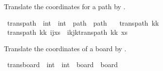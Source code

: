\begin{isabellebody}
%
\isadelimdocument
%
\endisadelimdocument
%
\isatagdocument
%
\isamarkuptrue%
%
\endisatagdocument
{\isafolddocument}%
%
\isadelimdocument
%
\endisadelimdocument
%
\begin{isamarkuptext}%
Translate the coordinates for a path by .%
\end{isamarkuptext}\isamarkuptrue%
\isamarkupfalse%
\ trans{\isacharunderscore}{\kern0pt}path\ {\isacharcolon}{\kern0pt}{\isacharcolon}{\kern0pt}\ {\isachardoublequoteopen}int\ {\isasymtimes}\ int\ {\isasymRightarrow}\ path\ {\isasymRightarrow}\ path{\isachardoublequoteclose}\ \isanewline
\ \ {\isachardoublequoteopen}trans{\isacharunderscore}{\kern0pt}path\ {\isacharparenleft}{\kern0pt}kk\ {\isacharbrackleft}{\kern0pt}{\isacharbrackright}{\kern0pt}\ {\isacharequal}{\kern0pt}\ {\isacharbrackleft}{\kern0pt}{\isacharbrackright}{\kern0pt}{\isachardoublequoteclose}\isanewline
{\isacharbar}{\kern0pt}\ {\isachardoublequoteopen}trans{\isacharunderscore}{\kern0pt}path\ {\isacharparenleft}{\kern0pt}kk\ {\isacharparenleft}{\kern0pt}{\isacharparenleft}{\kern0pt}i{\isacharcomma}{\kern0pt}j{\isacharparenright}{\kern0pt}{\isacharhash}{\kern0pt}xs{\isacharparenright}{\kern0pt}\ {\isacharequal}{\kern0pt}\ {\isacharparenleft}{\kern0pt}i{\isacharplus}{\kern0pt}kj{\isacharplus}{\kern0pt}ktrans{\isacharunderscore}{\kern0pt}path\ {\isacharparenleft}{\kern0pt}kk\ xs{\isacharparenright}{\kern0pt}{\isachardoublequoteclose}%
\begin{isamarkuptext}%
Translate the coordinates of a board by .%
\end{isamarkuptext}\isamarkuptrue%
\isamarkupfalse%
\ trans{\isacharunderscore}{\kern0pt}board\ {\isacharcolon}{\kern0pt}{\isacharcolon}{\kern0pt}\ {\isachardoublequoteopen}int\ {\isasymtimes}\ int\ {\isasymRightarrow}\ board\ {\isasymRightarrow}\ board{\isachardoublequoteclose}\ \ \isanewline

\end{isabellebody}

